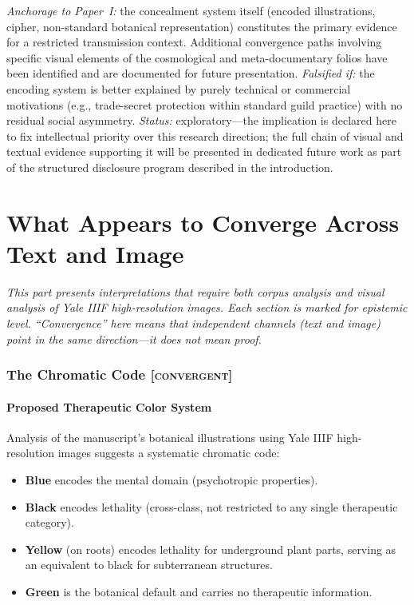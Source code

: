 \documentclass[11pt,a4paper]{article}
\newcommand{\convergent}{\textsc{[convergent]}}
\begin{document}
\textit{Anchorage to Paper~I:} the concealment system itself (encoded illustrations, cipher, non-standard botanical representation) constitutes the primary evidence for a restricted transmission context. Additional convergence paths involving specific visual elements of the cosmological and meta-documentary folios have been identified and are documented for future presentation. \textit{Falsified if:} the encoding system is better explained by purely technical or commercial motivations (e.g., trade-secret protection within standard guild practice) with no residual social asymmetry. \textit{Status:} exploratory---the implication is declared here to fix intellectual priority over this research direction; the full chain of visual and textual evidence supporting it will be presented in dedicated future work as part of the structured disclosure program described in the introduction.

\part{What Appears to Converge Across Text and Image}

\textit{This part presents interpretations that require both corpus analysis and visual analysis of Yale IIIF high-resolution images. Each section is marked for epistemic level. ``Convergence'' here means that independent channels (text and image) point in the same direction---it does not mean proof.}

\section{The Chromatic Code \convergent{}}

\subsection{Proposed Therapeutic Color System}

Analysis of the manuscript's botanical illustrations using Yale IIIF high-resolution images suggests a systematic chromatic code:

\begin{itemize}[leftmargin=2em]
\item \textbf{Blue} encodes the mental domain (psychotropic properties).
\item \textbf{Black} encodes lethality (cross-class, not restricted to any single therapeutic category).
\item \textbf{Yellow} (on roots) encodes lethality for underground plant parts, serving as an equivalent to black for subterranean structures.
\item \textbf{Green} is the botanical default and carries no therapeutic information.
\end{itemize}
\end{document}
